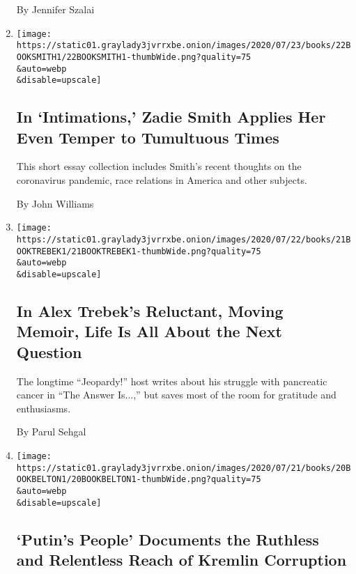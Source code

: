 \begin{enumerate}
  By Jennifer Szalai
\item
  \href{/2020/07/22/books/review-intimations-essays-zadie-smith.html}{}

  \texttt{[image: https://static01.graylady3jvrrxbe.onion/images/2020/07/23/books/22BOOKSMITH1/22BOOKSMITH1-thumbWide.png?quality=75\\\&auto=webp\\\&disable=upscale]}

  \hypertarget{in-intimations-zadie-smith-applies-her-even-temper-to-tumultuous-times}{%
  \subsection{In `Intimations,' Zadie Smith Applies Her Even Temper to
  Tumultuous
  Times}\label{in-intimations-zadie-smith-applies-her-even-temper-to-tumultuous-times}}

  This short essay collection includes Smith's recent thoughts on the
  coronavirus pandemic, race relations in America and other subjects.

  By John Williams
\item
  \href{/2020/07/21/books/review-answer-is-alex-trebek-jeopardy-memoir.html}{}

  \texttt{[image: https://static01.graylady3jvrrxbe.onion/images/2020/07/22/books/21BOOKTREBEK1/21BOOKTREBEK1-thumbWide.png?quality=75\\\&auto=webp\\\&disable=upscale]}

  \hypertarget{in-alex-trebeks-reluctant-moving-memoir-life-is-all-about-the-next-question}{%
  \subsection{In Alex Trebek's Reluctant, Moving Memoir, Life Is All
  About the Next
  Question}\label{in-alex-trebeks-reluctant-moving-memoir-life-is-all-about-the-next-question}}

  The longtime ``Jeopardy!'' host writes about his struggle with
  pancreatic cancer in ``The Answer Is...,'' but saves most of the room
  for gratitude and enthusiasms.

  By Parul Sehgal
\item
  \href{/2020/07/16/books/review-putins-people-kgb-catherine-belton.html}{}

  \texttt{[image: https://static01.graylady3jvrrxbe.onion/images/2020/07/21/books/20BOOKBELTON1/20BOOKBELTON1-thumbWide.png?quality=75\\\&auto=webp\\\&disable=upscale]}

  \hypertarget{putins-people-documents-the-ruthless-and-relentless-reach-of-kremlin-corruption}{%
  \subsection{`Putin's People' Documents the Ruthless and Relentless
  Reach of Kremlin
  Corruption}\label{putins-people-documents-the-ruthless-and-relentless-reach-of-kremlin-corruption}}


\end{enumerate}
